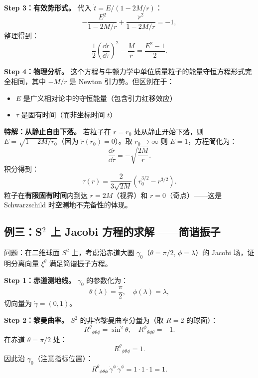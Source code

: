 \textbf{Step 3：有效势形式。} 代入 $\dot t = E/(1 - 2M/r)$：
\begin{equation}
    -\frac{E^2}{1 - 2M/r} + \frac{\dot r^2}{1 - 2M/r} = -1,
\end{equation}
整理得到：
\begin{equation}
    \boxed{\frac{1}{2}\left(\frac{\dd r}{\dd\tau}\right)^2 - \frac{M}{r} = \frac{E^2 - 1}{2}}.
\end{equation}

\textbf{Step 4：物理分析。} 这个方程与牛顿力学中单位质量粒子的能量守恒方程形式完全相同，其中 $-M/r$ 是 Newton 引力势。但区别在于：
\begin{itemize}
    \item $E$ 是广义相对论中的守恒能量（包含引力红移效应）
    \item $\tau$ 是固有时间（而非坐标时间 $t$）
\end{itemize}

\textbf{特解：从静止自由下落。} 若粒子在 $r = r_0$ 处从静止开始下落，则 $E = \sqrt{1 - 2M/r_0}$（因为 $\dot r(r_0) = 0$）。取 $r_0 \to \infty$ 则 $E = 1$，方程简化为：
\begin{equation}
    \frac{\dd r}{\dd\tau} = -\sqrt{\frac{2M}{r}}.
\end{equation}
积分得到：
\begin{equation}
    \tau(r) = \frac{2}{3\sqrt{2M}}\left(r_0^{3/2} - r^{3/2}\right).
\end{equation}
粒子在\textbf{有限固有时间}内到达 $r = 2M$（视界）和 $r = 0$（奇点）——这是 Schwarzschild 时空测地不完备性的体现。

\subsection{例三：S$^2$ 上 Jacobi 方程的求解——简谐振子}

问题：在二维球面 $S^2$ 上，考虑沿赤道大圆 $\gamma_0$（$\theta = \pi/2$, $\phi = \lambda$）的 Jacobi 场，证明分离向量 $\xi^\theta$ 满足简谐振子方程。

\textbf{Step 1：赤道测地线。} $\gamma_0$ 的参数化为：
\begin{equation}
    \theta(\lambda) = \frac{\pi}{2}, \quad \phi(\lambda) = \lambda,
\end{equation}
切向量为 $\dot\gamma = (0, 1)$。

\textbf{Step 2：黎曼曲率。} $S^2$ 的非零黎曼曲率分量为（取 $R = 2$ 的球面）：
\begin{equation}
    R^\theta{}_{\phi\theta\phi} = \sin^2\theta, \quad R^\phi{}_{\theta\phi\theta} = -1.
\end{equation}
在赤道 $\theta = \pi/2$ 处：
\begin{equation}
    R^\theta{}_{\phi\theta\phi} = 1.
\end{equation}
因此沿 $\gamma_0$（注意指标位置）：
\begin{equation}
    R^\theta{}_{\phi\theta\phi} \, \dot\gamma^\phi \, \dot\gamma^\phi = 1 \cdot 1 \cdot 1 = 1.
\end{equation}

